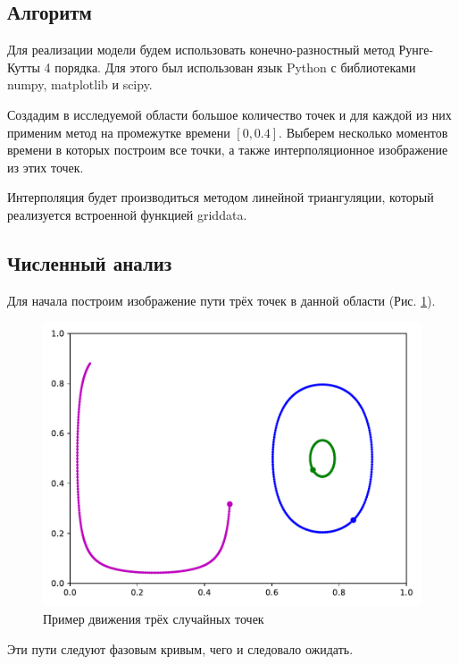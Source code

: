     \subsection{Алгоритм}
        Для реализации модели будем использовать конечно-разностный метод Рунге-Кутты 4 порядка. Для этого был использован язык Python с библиотеками numpy, matplotlib и scipy.

        Создадим в исследуемой области большое количество точек и для каждой из них применим метод на промежутке времени \( [0, 0.4] \). Выберем несколько моментов времени в которых построим все точки, а также интерполяционное изображение из этих точек.
        
        Интерполяция будет производиться методом линейной триангуляции, который реализуется встроенной функцией griddata.

    \subsection{Численный анализ}
        Для начала построим изображение пути трёх точек в данной области (Рис. \ref{3pts}).
        \begin{figure}[H]
            \centering
            \includegraphics[width=12cm]{pictures/three.pdf}
            \caption{Пример движения трёх случайных точек} \label{3pts}
        \end{figure}
        Эти пути следуют фазовым кривым, чего и следовало ожидать.

